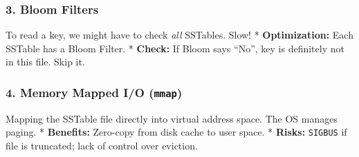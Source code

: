 \hypertarget{bloom-filters}{%
\subsubsection{3. Bloom Filters}\label{bloom-filters}}

To read a key, we might have to check \emph{all} SSTables. Slow! *
\textbf{Optimization:} Each SSTable has a Bloom Filter. *
\textbf{Check:} If Bloom says ``No'', key is definitely not in this
file. Skip it.

\hypertarget{memory-mapped-io-mmap}{%
\subsubsection{\texorpdfstring{4. Memory Mapped I/O
(\texttt{mmap})}{4. Memory Mapped I/O (mmap)}}\label{memory-mapped-io-mmap}}

Mapping the SSTable file directly into virtual address space. The OS
manages paging. * \textbf{Benefits:} Zero-copy from disk cache to user
space. * \textbf{Risks:} \passthrough{\lstinline!SIGBUS!} if file is
truncated; lack of control over eviction.
